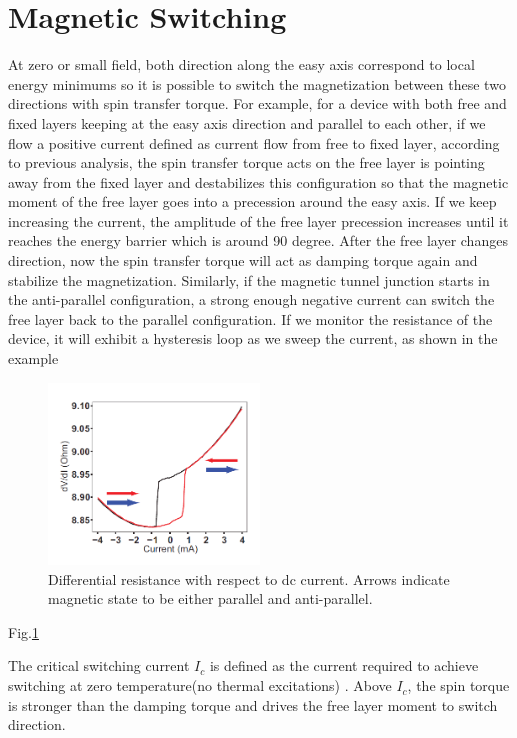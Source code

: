 \section{Magnetic Switching}

At zero or small field, both direction along the easy axis correspond to local energy minimums so it is possible to switch the magnetization between these two directions with spin transfer torque. For example, for a device with both free and fixed layers keeping at the easy axis direction and parallel to each other, if we flow a positive current defined as current flow from free to fixed layer, according to previous analysis, the spin transfer torque acts on the free layer is pointing away from the fixed layer and destabilizes this configuration so that the magnetic moment of the free layer goes into a precession around the easy axis. If we keep increasing the current, the amplitude of the free layer precession increases until it reaches the energy barrier which is around 90 degree. After the free layer changes direction, now the spin transfer torque will act as damping torque again and stabilize the magnetization. Similarly, if the magnetic tunnel junction starts in the anti-parallel configuration, a strong enough negative current can switch the free layer back to the parallel configuration. If we monitor the resistance of the device, it will exhibit a hysteresis loop as we sweep the current, as shown in the example

\begin{figure}[h!]
	\centering
	\includegraphics[width=0.5\textwidth]{fig/DC.PNG}
	\caption{Differential resistance with respect to dc current. Arrows indicate magnetic state to be either parallel and anti-parallel.}
	\label{fig:DC}
\end{figure}


Fig.\ref{fig:DC}



The critical switching current $I_c$ is defined as the current required to achieve switching at zero temperature(no thermal excitations)  . Above $I_c$, the spin torque is stronger than the damping torque and drives the free layer moment to switch direction.

